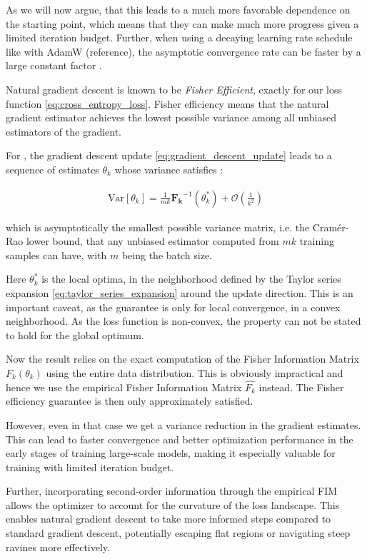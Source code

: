 As we will now argue, that this leads to a much more favorable dependence on the starting point, which means that they can make much more progress given a limited iteration budget. Further, when using a decaying learning rate schedule like with AdamW (reference), the asymptotic convergence rate can be faster by a large constant factor \citep{martens2020new}.

Natural gradient descent is known \citep{martens2020new} to be \textit{Fisher Efficient}, exactly for our loss function \ref{eq:cross_entropy_loss}. Fisher efficiency means that the natural gradient estimator achieves the lowest possible variance among all unbiased estimators of the gradient.

For \lowrank, the gradient descent update \ref{eq:gradient_descent_update} leads to a sequence of estimates \( \theta_{k} \) whose variance satisfies \citep{amariNaturalGradientWorks1998}:

\begin{eqnarray}
\text{Var}[\theta_{k}] = \frac{1}{mk} \mathbf{F_{k}} ^{-1}(\theta_{k}^*) + \mathcal{O}\left(\frac{1}{k^2}\right)
\end{eqnarray}

which is asymptotically the smallest possible variance matrix, i.e. the Cramér-Rao lower bound, that any unbiased estimator computed from \(mk\) training samples can have, with \(m\) being the batch size.

Here \(\theta_{k}^*\) is the local optima, in the neighborhood defined by the Taylor series expansion \ref{eq:taylor_series_expansion} around the update direction. This is an important caveat, as the guarantee is only for local convergence, in a convex neighborhood. As the loss function is non-convex, the property can not be stated to hold for the global optimum.

Now the result relies on the exact computation of the Fisher Information Matrix \( F_{k}(\theta_{k}) \) using the entire data distribution. This is obviously impractical and hence we use the empirical Fisher Information Matrix \(\hat{F_{k}}\) instead. The Fisher efficiency guarantee is then only approximately satisfied.

However, even in that case we get a variance reduction in the gradient estimates. This can lead to faster convergence and better optimization performance in the early stages of training large-scale models, making it especially valuable for training with limited iteration budget.

Further, incorporating second-order information through the empirical FIM allows the optimizer to account for the curvature of the loss landscape. This enables natural gradient descent to take more informed steps compared to standard gradient descent, potentially escaping flat regions or navigating steep ravines more effectively.

